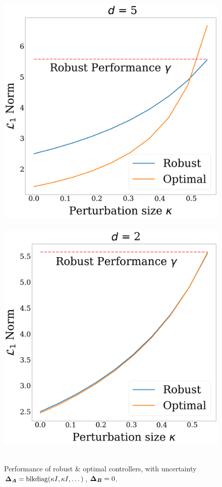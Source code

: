 \begin{figure}
\centering
~\includegraphics[width=.45\columnwidth]{d5.png}~\includegraphics[width=.45\columnwidth]{d2.png}~
\caption{Performance of robust \& optimal controllers, with uncertainty  ${\boldsymbol{\Delta}}_{\boldsymbol{A}} = \mathrm{blkdiag}(\kappa I, \kappa I, \dots)$, ${\boldsymbol{\Delta}}_{\boldsymbol{B}} = 0$. }%
\label{fig:kappa}
\end{figure}

